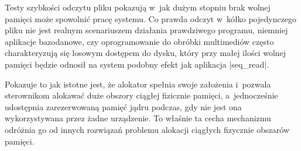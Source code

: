 Testy szybkości odczytu pliku pokazują w~jak dużym stopniu brak wolnej
pamięci może spowolnić pracę systemu.  Co prawda odczyt w~kółko
pojedynczego pliku nie jest realnym scenariuszem działania prawdziwego
programu, niemniej aplikacje bazodanowe, czy oprogramowanie do obróbki
multimediów często charakteryzują się losowym dostępem do dysku, który
przy małej ilości wolnej pamięci będzie odnosił na system podobny
efekt jak aplikacja \code|seq_read|.

Pokazuje to jak istotne jest, że alokator  spełnia swoje
założenia i~pozwala sterownikom alokawać duże obszory ciągłej
fizicznie pamięci, a~jednocześnie udostępnia zarezerwowaną pamięć
jądru podczas, gdy nie jest ona wykorzystywana przez żadne urządzenie.
To właśnie ta cecha mechanizmu  odróżnia go od innych
rozwiązań problemu alokacji ciągłych fizycznie obszarów pamięci.
